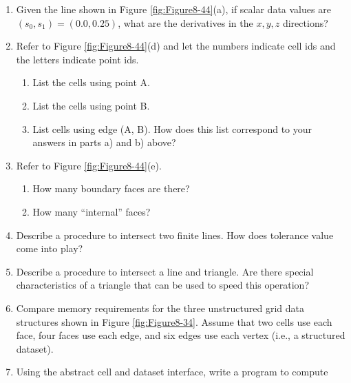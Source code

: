 \begin{enumerate}
\begin{enumerate}
    \end{enumerate}

\item Given the line shown in Figure \ref{fig:Figure8-44}(a), if scalar data values are $(s_0, s_1) = (0.0, 0.25)$, what are the derivatives in the $x, y, z$ directions?

\item Refer to Figure \ref{fig:Figure8-44}(d) and let the numbers indicate cell ids and the letters indicate point ids.
    \begin{enumerate}

    \item List the cells using point A.

    \item List the cells using point B.

    \item List cells using edge (A, B). How does this list correspond to your answers in parts a) and b) above?

    \end{enumerate}

\item Refer to Figure \ref{fig:Figure8-44}(e).
    \begin{enumerate}

    \item How many boundary faces are there?

    \item How many ``internal'' faces?

    \end{enumerate}

\item Describe a procedure to intersect two finite lines. How does tolerance value come into play?

\item Describe a procedure to intersect a line and triangle. Are there special characteristics of a triangle that can be used to speed this operation?

\item Compare memory requirements for the three unstructured grid data structures shown in Figure \ref{fig:Figure8-34}. Assume that two cells use each face, four faces use each edge, and six edges use each vertex (i.e., a structured dataset).

\item Using the abstract cell and dataset interface, write a program to compute
    \begin{enumerate}


\end{enumerate}
\end{enumerate}
